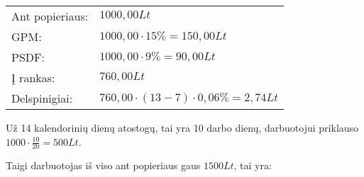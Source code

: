 \begin{tasks}
\begin{task}
\begin{solution}
      \begin{tabularx}{15cm}{p{7.5cm}|p{7.5cm}}
        Ant popieriaus: & $1000,00Lt$ \\
        GPM: & $1000,00 \cdot 15\% = 150,00Lt$ \\
        PSDF: & $1000,00 \cdot 9\% = 90,00Lt$ \\
        Į rankas: & $760,00Lt$ \\
        Delspinigiai: & $760,00 \cdot (13 - 7) \cdot 0,06\% = 2,74Lt$ \\
      \end{tabularx}

      Už 14 kalendorinių dienų atostogų, tai yra 10 darbo dienų,
      darbuotojui priklauso $1000 \cdot \frac{10}{20} = 500 Lt$.

      Taigi darbuotojas iš viso ant popieriaus gaus $1500 Lt$,
      tai yra:

      
    \end{solution}
  \end{task}
\end{tasks}
